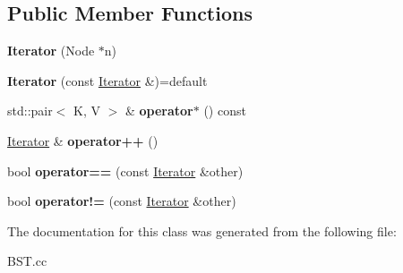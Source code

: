 \subsection*{Public Member Functions}
\begin{DoxyCompactItemize}
\item 
\mbox{\label{classBST_1_1Iterator_ad4df476398bc2beefa629a268483b858}} 
{\bfseries Iterator} (Node $\ast$n)
\item 
\mbox{\label{classBST_1_1Iterator_ab63f266d2bb558c16a6b41a37e97b9a7}} 
{\bfseries Iterator} (const \hyperlink{classBST_1_1Iterator}{Iterator} \&)=default
\item 
\mbox{\label{classBST_1_1Iterator_a0fb988985a3cdb4db50669728a2bac38}} 
std\+::pair$<$ K, V $>$ \& {\bfseries operator$\ast$} () const
\item 
\mbox{\label{classBST_1_1Iterator_a32b913d6726c2c4001e0952929aa518b}} 
\hyperlink{classBST_1_1Iterator}{Iterator} \& {\bfseries operator++} ()
\item 
\mbox{\label{classBST_1_1Iterator_a8712eb01caaf9e128006f453d5ecd90c}} 
bool {\bfseries operator==} (const \hyperlink{classBST_1_1Iterator}{Iterator} \&other)
\item 
\mbox{\label{classBST_1_1Iterator_a3a51010bf5571619a28a8d01b243c863}} 
bool {\bfseries operator!=} (const \hyperlink{classBST_1_1Iterator}{Iterator} \&other)
\end{DoxyCompactItemize}


The documentation for this class was generated from the following file\+:\begin{DoxyCompactItemize}
\item 
B\+S\+T.\+cc\end{DoxyCompactItemize}
